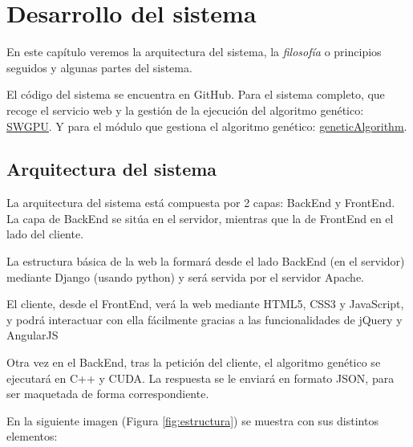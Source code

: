 \chapter{Desarrollo del sistema}

\bigskip
En este capítulo veremos la arquitectura del sistema, la \textit{filosofía} o principios seguidos y algunas partes del sistema.

\bigskip
El código del sistema se encuentra en GitHub. Para el sistema completo, que recoge el servicio web y la gestión de la ejecución del algoritmo genético: \textcolor{blue}{\underline{\href{https://github.com/JCristobal/SWGPU}{SWGPU}}}. Y para el módulo que gestiona el algoritmo genético: \textcolor{blue}{\underline{\href{https://github.com/JCristobal/geneticAlgorithm}{geneticAlgorithm}}}.


\bigskip
\section{Arquitectura del sistema}
\bigskip

La arquitectura del sistema está compuesta por 2 capas: BackEnd y FrontEnd. La capa de BackEnd se sitúa en el servidor, mientras que la de FrontEnd en el lado del cliente.

\bigskip
La estructura básica de la web la formará desde el lado BackEnd (en el servidor) mediante Django (usando python) y será servida por el servidor Apache. 

El cliente, desde el FrontEnd, verá la web mediante HTML5, CSS3 y JavaScript, y podrá interactuar con ella fácilmente gracias a las funcionalidades de jQuery y AngularJS

Otra vez en el BackEnd, tras la petición del cliente, el algoritmo genético se ejecutará en C++ y CUDA. La respuesta se le enviará en formato JSON, para ser maquetada de forma correspondiente.


\bigskip
En la siguiente imagen (Figura \ref{fig:estructura}) se muestra con sus distintos elementos:

